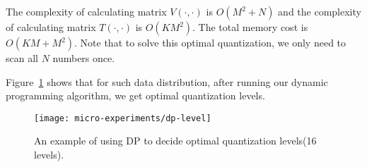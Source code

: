 The complexity of calculating matrix $V(\cdot, \cdot)$ is $O(M^2 + N)$ and the complexity of calculating matrix $T(\cdot, \cdot)$ is $O(KM^2)$. The total memory cost is $O(KM + M^2)$. Note that to solve this optimal quantization, we only need to scan all $N$ numbers once.

Figure~\ref{fig:optimalquantization} shows that for such data distribution, after running our dynamic programming algorithm, 
we get optimal quantization levels.
\begin{figure}[h]
\centering    
\texttt{[image: micro-experiments/dp-level]} 
\caption{An example of using DP to decide optimal quantization levels(16 levels).}
\label{fig:optimalquantization}
\end{figure} 



